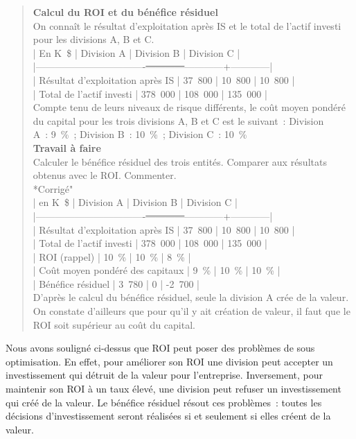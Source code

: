 \documentclass{tufte-handout}
\begin{document}
\begin{enumerate}
\begin{verse}
\textbf{Calcul du ROI et du bénéfice résiduel}\\
On connaît le résultat d'exploitation après IS et le total de l'actif investi pour les divisions A, B et C.\\
| En K \$                           | Division A | Division B | Division C |\\
|----------------------------------\sout{------------}------------+------------|\\
| Résultat d'exploitation après IS | 37 800     | 10 800     | 10 800     |\\
| Total de l'actif investi         | 378 000    | 108 000    | 135 000    |\\
Compte tenu de leurs niveaux de risque différents, le coût moyen pondéré\\
du capital pour les trois divisions A, B et C est le suivant : Division\\
A : 9 \% ; Division B : 10 \% ; Division C : 10 \%\\
\textbf{Travail à faire}\\
Calculer le bénéfice résiduel des trois entités. Comparer aux résultats\\
obtenus avec le ROI. Commenter.\\
*Corrigé"\\
| en K \$                           | Division A | Division B | Division C |\\
|----------------------------------\sout{------------}------------+------------|\\
| Résultat d'exploitation après IS | 37 800     | 10 800     | 10 800     |\\
| Total de l'actif investi         | 378 000    | 108 000    | 135 000    |\\
| ROI (rappel)                     | 10 \%       | 10 \%       | 8 \%        |\\
| Coût moyen pondéré des capitaux  | 9 \%        | 10 \%       | 10 \%       |\\
| Bénéfice résiduel                | 3 780      | 0          | -2 700     |\\
D'après le calcul du bénéfice résiduel, seule la division A crée de la valeur. On constate d'ailleurs que pour qu'il y ait création de valeur, il faut que le ROI soit supérieur au coût du capital.\\
\end{verse}

Nous avons souligné ci-dessus que ROI peut poser des problèmes de sous optimisation. En effet, pour améliorer son ROI une division peut accepter un investissement qui détruit de la valeur pour l'entreprise. Inversement, pour maintenir son ROI à un taux élevé, une division peut refuser un investissement qui créé de la valeur. Le bénéfice résiduel résout ces problèmes : toutes les décisions d'investissement seront réalisées si et seulement si elles créent de la valeur.\\


\end{enumerate}
\end{document}
